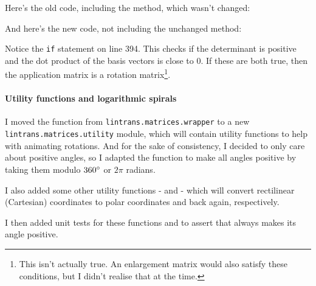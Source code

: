 \documentclass[../development.tex]{subfiles}
\begin{document}
Here's the old code, including the  method, which wasn't changed:


And here's the new code, not including the unchanged  method:


Notice the \texttt{if} statement on line 394. This checks if the determinant is positive and the dot product of the basis vectors is close to 0. If these are both true, then the application matrix is a rotation matrix\footnote{This isn't actually true. An enlargement matrix would also satisfy these conditions, but I didn't realise that at the time.\label{footnote:not-only-a-rotation-matrix}}.

\paragraph{Utility functions and logarithmic spirals\label{development:making-v0.2.2:animating-rotations:utility-functions-and-logarithmic-spirals}}

I moved the  function from \texttt{lintrans.matrices.wrapper} to a new \texttt{lintrans.matrices.utility} module, which will contain utility functions to help with animating rotations. And for the sake of consistency, I decided to only care about positive angles, so I adapted the function to make all angles positive by taking them modulo $360\degree$ or $2\pi$ radians.

I also added some other utility functions -  and  - which will convert rectilinear (Cartesian) coordinates to polar coordinates and back again, respectively.


I then added unit tests for these functions and to assert that  always makes its angle positive.


\end{document}
